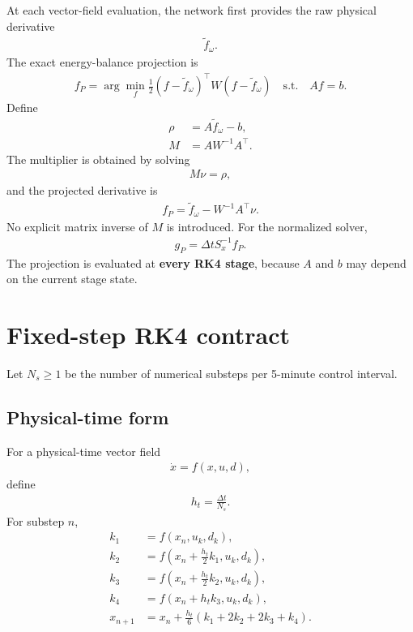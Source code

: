 \documentclass[11pt]{article}
\newcommand{\dt}{\Delta t}
\begin{document}
At each vector-field evaluation, the network first provides the raw physical derivative
\begin{align}
\widetilde f_\omega.
\end{align}
The exact energy-balance projection is
\begin{align}
f_P
=
\arg\min_f
\frac12
(f-\widetilde f_\omega)^\top
W
(f-\widetilde f_\omega)
\quad
\text{s.t.}
\quad
Af=b.
\tag{6.14}
\end{align}
Define
\begin{align}
\rho&=A\widetilde f_\omega-b,
\\
M&=AW^{-1}A^\top.
\end{align}
The multiplier is obtained by solving
\begin{align}
\boxed{
M\nu=\rho,
}
\tag{6.15}
\end{align}
and the projected derivative is
\begin{align}
\boxed{
f_P
=
\widetilde f_\omega
-
W^{-1}A^\top\nu.
}
\tag{6.16}
\end{align}
No explicit matrix inverse of \(M\) is introduced.  For the normalized solver,
\begin{align}
\boxed{
g_P
=
\dt S_x^{-1}f_P.
}
\tag{6.17}
\end{align}
The projection is evaluated at \textbf{every RK4 stage}, because \(A\) and \(b\) may depend on
the current stage state.

\section{Fixed-step RK4 contract}

Let \(N_s\ge1\) be the number of numerical substeps per 5-minute control interval.

\subsection{Physical-time form}

For a physical-time vector field
\begin{align}
\dot x=f(x,u,d),
\end{align}
define
\begin{align}
h_t=\frac{\dt}{N_s}.
\end{align}
For substep \(n\),
\begin{align}
k_1&=f(x_n,u_k,d_k),
\\
k_2&=f\!\left(x_n+\frac{h_t}{2}k_1,u_k,d_k\right),
\\
k_3&=f\!\left(x_n+\frac{h_t}{2}k_2,u_k,d_k\right),
\\
k_4&=f\!\left(x_n+h_tk_3,u_k,d_k\right),
\\
x_{n+1}
&=
x_n
+
\frac{h_t}{6}
(k_1+2k_2+2k_3+k_4).
\tag{6.18}
\end{align}
\end{document}
